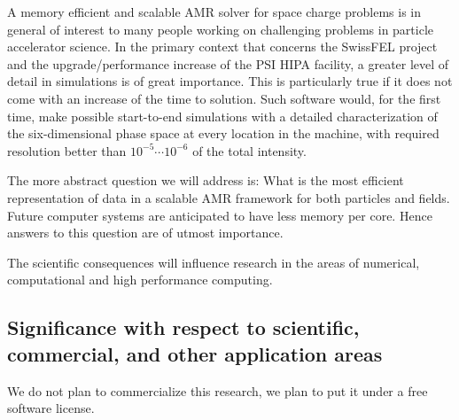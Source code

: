 \documentclass[11pt,pdftex]{article}
\begin{document}
\label{sec:sign}

A memory efficient and scalable AMR solver for space charge problems is
in general of interest to many people working on challenging problems in
particle accelerator science.  In the primary context that concerns the
SwissFEL project and the upgrade/performance increase of the PSI HIPA
facility, a greater level of detail in simulations is of great
importance.  This is particularly true if it does not come with an
increase of the time to solution.  Such software would, for the first
time, make possible start-to-end simulations with a detailed
characterization of the six-dimensional phase space at every location in
the machine, with required resolution better than $10^{-5} \cdots
10^{-6}$ of the total intensity.

The more abstract question we will address is: What is the most
efficient representation of data in a scalable AMR framework for both
particles and fields.  Future computer systems are anticipated to have
less memory per core.  Hence answers to this question are of utmost
importance.

The scientific consequences will influence research in the areas of
numerical, computational and high performance computing.



\subsection{Significance with respect to scientific, commercial, and
  other application areas}
\label{sec:sign2}
We do not plan to commercialize this research, we plan to put it under a free software license. 


{\small
  
  
}
\end{document}
